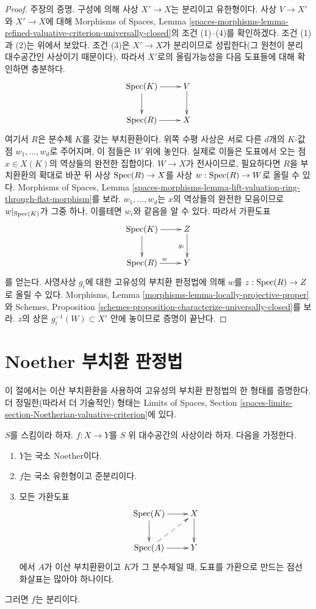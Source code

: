 \begin{proof}
\medskip\noindent
주장의 증명. 구성에 의해 사상 $X' \to X$는 분리이고 유한형이다.
사상 $V \to X'$와 $X' \to X$에 대해 Morphisms of Spaces, Lemma
\ref{spaces-morphisms-lemma-refined-valuative-criterion-universally-closed}의
조건 (1)--(4)를 확인하겠다. 조건 (1)과 (2)는 위에서 보았다.
조건 (3)은 $X' \to X$가 분리이므로 성립한다(그 원천이 분리
대수공간인 사상이기 때문이다). 따라서 $X'$로의 올림가능성을 다음
도표들에 대해 확인하면 충분하다.
$$
\xymatrix{
\Spec(K) \ar[r] \ar[d] & V \ar[d] \\
\Spec(R) \ar[r] & X
}
$$
여기서 $R$은
분수체 $K$를 갖는 부치환환이다. 위쪽 수평 사상은 서로 다른
$d$개의 $K$-값 점 $w_1, \ldots, w_d$로 주어지며, 이 점들은 $W$ 위에
놓인다. 실제로 이들은
도표에서 오는 점 $x \in X(K)$의 역상들의 완전한 집합이다.
$W \to X$가 전사이므로, 필요하다면 $R$을 부치환환의 확대로 바꾼 뒤
사상 $\mathop{\mathrm{Spec}}(R) \to X$를 사상 $w : \mathop{\mathrm{Spec}}(R) \to W$로 올릴 수 있다.
Morphisms of Spaces, Lemma
\ref{spaces-morphisms-lemma-lift-valuation-ring-through-flat-morphism}를 보라.
$w_1, \ldots, w_d$는 $x$의 역상들의 완전한 모음이므로
$w|_{\mathop{\mathrm{Spec}}(K)}$가 그중 하나, 이를테면 $w_i$와 같음을 알 수 있다.
따라서 가환도표
$$
\xymatrix{
\Spec(K) \ar[r] \ar[d] &  Z \ar[d]_{g_i}\\
\Spec(R) \ar[r]^w & Y
}
$$
를 얻는다. 사영사상 $g_i$에 대한 고유성의 부치환 판정법에 의해
$w$를 $z : \mathop{\mathrm{Spec}}(R) \to Z$로 올릴 수 있다. Morphisms, Lemma
\ref{morphisms-lemma-locally-projective-proper}와 Schemes, Proposition
\ref{schemes-proposition-characterize-universally-closed}를 보라.
$z$의 상은 $g_i^{-1}(W) \subset X'$ 안에 놓이므로 증명이 끝난다.
\end{proof}







\section{Noether 부치환 판정법}
\label{section-Noetherian-valuative-criterion}

\noindent
이 절에서는 이산 부치환환을 사용하여 고유성의 부치환 판정법의 한
형태를 증명한다. 더 정밀한(따라서 더 기술적인) 형태는 Limits of
Spaces, Section
\ref{spaces-limits-section-Noetherian-valuative-criterion}에 있다.

\begin{lemma}
\label{lemma-check-separated-dvr}
$S$를 스킴이라 하자. $f : X \to Y$를 $S$ 위 대수공간의 사상이라
하자. 다음을 가정한다.
\begin{enumerate}
\item $Y$는 국소 Noether이다.
\item $f$는 국소 유한형이고 준분리이다.
\item 모든 가환도표
$$
\xymatrix{
\Spec(K) \ar[r] \ar[d] & X \ar[d] \\
\Spec(A) \ar[r] \ar@{-->}[ru] & Y
}
$$
에서 $A$가 이산 부치환환이고 $K$가 그 분수체일 때, 도표를 가환으로
만드는 점선 화살표는 많아야 하나이다.
\end{enumerate}
그러면 $f$는 분리이다.
\end{lemma}

